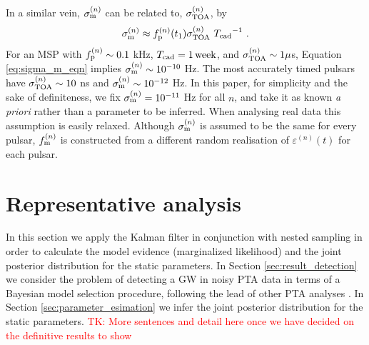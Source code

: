 \documentclass[fleqn,usenatbib,useAMS]{mnras}
\begin{document}
	In a similar vein, $\sigma_{\rm m}^{(n)}$ can be related to, $\sigma_{\rm TOA}^{(n)}$, by 
	\begin{equation}
		\sigma_{\rm m}^{(n)} \approx f_{\rm p}^{(n)}(t_1) \sigma_{\rm TOA}^{(n)} \ {T_{\rm cad}}^{-1} \ . \label{eq:sigma_m_eqn}
	\end{equation}
	For an MSP with $f_{\rm p}^{(n)} \sim 0.1$ kHz, $T_{\rm cad} = 1 \, {\rm week}$, and $\sigma_{\rm TOA}^{(n)} \sim 1 \mu$s,  Equation \eqref{eq:sigma_m_eqn} implies $\sigma_{\rm m}^{(n)} \sim 10^{-10}$ Hz. The most accurately timed pulsars have $\sigma_{\rm TOA}^{(n)} \sim 10 $ ns and $\sigma_{\rm m}^{(n)} \sim 10^{-12}$ Hz. In this paper, for simplicity and the sake of definiteness, we fix $\sigma_{\rm m}^{(n)} = 10^{-11}$ Hz for all $n$, and take it as known \textit{a priori} rather than a parameter to be inferred. When analysing real data this assumption is easily relaxed. Although $\sigma_{\rm m}^{(n)}$ is assumed to be the same for every pulsar, $f_{\rm m} ^{(n)}$ is constructed from a different random realisation of $\varepsilon^{(n)}(t)$ for each pulsar. \newline  
	




\section{Representative analysis}\label{sec:representative_analysis}
In this section we apply the Kalman filter in conjunction with nested sampling in order to calculate the model evidence (marginalized likelihood) and the joint posterior distribution for the static parameters. In Section \ref{sec:result_detection} we consider the problem of detecting a GW in noisy PTA data in terms of a Bayesian model selection procedure, following the lead of other PTA analyses \citep[e.g.][]{2023ApJ...951L...8A,2023arXiv230616214A,2023ApJ...951L...6R,2023RAA....23g5024X}. In Section \ref{sec:parameter_esimation} we infer the joint posterior distribution for the static parameters. \textcolor{red}{TK: More sentences and detail here once we have decided on the definitive results to show}
\end{document}
